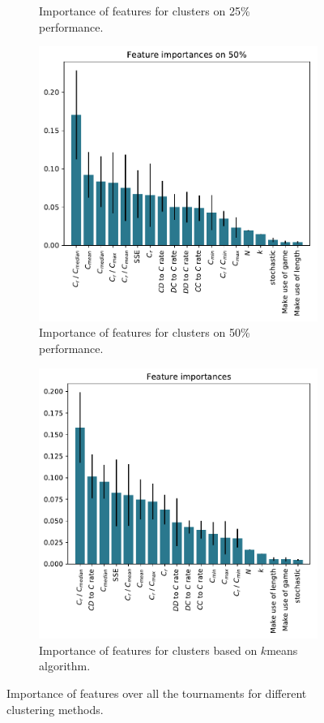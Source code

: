 \documentclass{article}
\begin{document}
\begin{figure}[!htbp]
\begin{subfigure}[t]{0.5\textwidth}
\begin{center}
        \end{center}
        \caption{Importance of features for clusters on 25\% performance.}
    \end{subfigure}
    \begin{subfigure}[t]{0.5\textwidth}
        \begin{center}
            \includegraphics[width=.75\linewidth]{../new_output/merged/_feature_importance_bar_plot_cluster_on_0_5.pdf}
        \end{center}
        \caption{Importance of features for clusters on 50\% performance.}
    \end{subfigure}
    \begin{subfigure}[t]{0.5\textwidth}
        \begin{center}
            \includegraphics[width=.75\linewidth]{../k_means_output/merged/_feature_importance_bar_plot.pdf}
        \end{center}
        \caption{Importance of features for clusters based on \(k\)means algorithm.}
    \end{subfigure}
    \caption{Importance of features over all the tournaments for different
    clustering methods.}\label{fig:clustering_importance_overall}
\end{figure}
\end{document}
